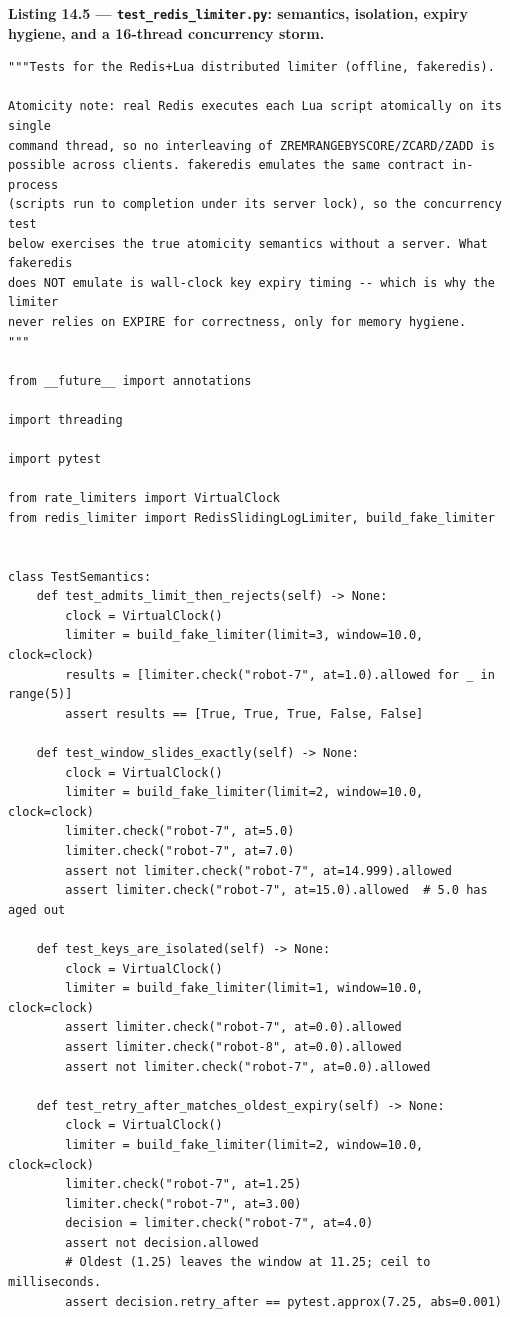\noindent\textbf{Listing 14.5 --- \texttt{test\_redis\_limiter.py}:
semantics, isolation, expiry hygiene, and a 16-thread concurrency storm.}
\label{lst:ch14-redis-tests}
\begin{verbatim}
"""Tests for the Redis+Lua distributed limiter (offline, fakeredis).

Atomicity note: real Redis executes each Lua script atomically on its single
command thread, so no interleaving of ZREMRANGEBYSCORE/ZCARD/ZADD is
possible across clients. fakeredis emulates the same contract in-process
(scripts run to completion under its server lock), so the concurrency test
below exercises the true atomicity semantics without a server. What fakeredis
does NOT emulate is wall-clock key expiry timing -- which is why the limiter
never relies on EXPIRE for correctness, only for memory hygiene.
"""

from __future__ import annotations

import threading

import pytest

from rate_limiters import VirtualClock
from redis_limiter import RedisSlidingLogLimiter, build_fake_limiter


class TestSemantics:
    def test_admits_limit_then_rejects(self) -> None:
        clock = VirtualClock()
        limiter = build_fake_limiter(limit=3, window=10.0, clock=clock)
        results = [limiter.check("robot-7", at=1.0).allowed for _ in range(5)]
        assert results == [True, True, True, False, False]

    def test_window_slides_exactly(self) -> None:
        clock = VirtualClock()
        limiter = build_fake_limiter(limit=2, window=10.0, clock=clock)
        limiter.check("robot-7", at=5.0)
        limiter.check("robot-7", at=7.0)
        assert not limiter.check("robot-7", at=14.999).allowed
        assert limiter.check("robot-7", at=15.0).allowed  # 5.0 has aged out

    def test_keys_are_isolated(self) -> None:
        clock = VirtualClock()
        limiter = build_fake_limiter(limit=1, window=10.0, clock=clock)
        assert limiter.check("robot-7", at=0.0).allowed
        assert limiter.check("robot-8", at=0.0).allowed
        assert not limiter.check("robot-7", at=0.0).allowed

    def test_retry_after_matches_oldest_expiry(self) -> None:
        clock = VirtualClock()
        limiter = build_fake_limiter(limit=2, window=10.0, clock=clock)
        limiter.check("robot-7", at=1.25)
        limiter.check("robot-7", at=3.00)
        decision = limiter.check("robot-7", at=4.0)
        assert not decision.allowed
        # Oldest (1.25) leaves the window at 11.25; ceil to milliseconds.
        assert decision.retry_after == pytest.approx(7.25, abs=0.001)


\end{verbatim}
